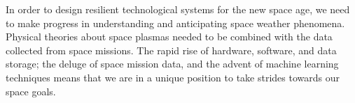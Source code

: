 In order to design resilient technological systems for the new space age, we need to make progress 
in understanding and anticipating space weather phenomena. Physical theories about space plasmas 
needed to be combined with the data collected from space missions. The rapid rise of hardware, 
software, and data storage; the deluge of space mission data, and the advent of machine learning 
techniques means that we are in a unique position to take strides towards our space goals.


%
%
